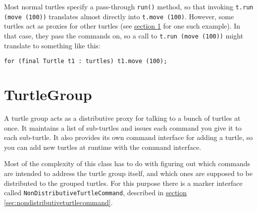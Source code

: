 \documentclass{report}
\newcommand{\Ref}[2]{\hyperref[#2]{#1 \ref*{#2}}}
\begin{document}
      Most normal turtles specify a pass-through {\tt run()} method, so that invoking \verb|t.run (move (100))| translates almost directly into
      \verb|t.move (100)|. However, some turtles act as proxies for other turtles (see \Ref{section}{sec:turtlegroup} for one such example). In that case, they
      pass the commands on, so a call to \verb|t.run (move (100))| might translate to something like this:

\begin{verbatim}
for (final Turtle t1 : turtles) t1.move (100);
\end{verbatim}

\section {TurtleGroup} \label{sec:turtlegroup}
      A turtle group acts as a distributive proxy for talking to a bunch of turtles at once. It maintains a list of sub-turtles and issues each command you give
      it to each sub-turtle. It also provides its own command interface for adding a turtle, so you can add new turtles at runtime with the command interface.

      Most of the complexity of this class has to do with figuring out which commands are intended to address the turtle group itself, and which ones are
      supposed to be distributed to the grouped turtles. For this purpose there is a marker interface called {\tt NonDistributiveTurtleCommand}, described in
      \Ref{section}{sec:nondistributiveturtlecommand}.
\end{document}
